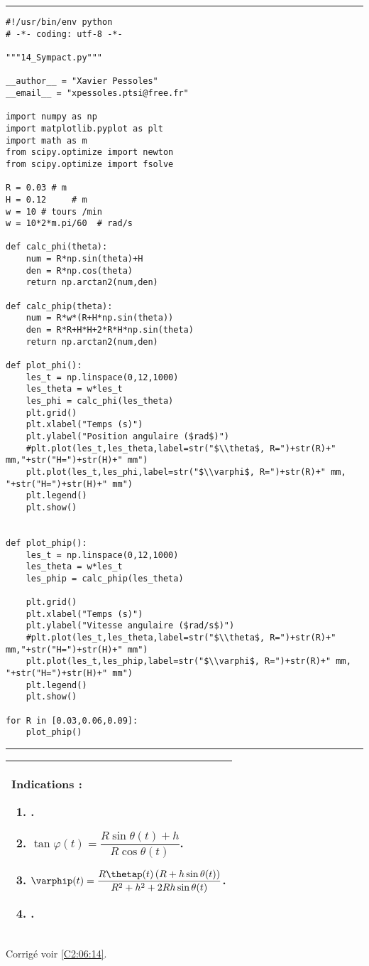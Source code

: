\noindent\hrule
\begin{lstlisting}
#!/usr/bin/env python
# -*- coding: utf-8 -*-

"""14_Sympact.py"""

__author__ = "Xavier Pessoles"
__email__ = "xpessoles.ptsi@free.fr"

import numpy as np
import matplotlib.pyplot as plt
import math as m
from scipy.optimize import newton
from scipy.optimize import fsolve

R = 0.03 # m
H = 0.12     # m
w = 10 # tours /min
w = 10*2*m.pi/60  # rad/s

def calc_phi(theta):
    num = R*np.sin(theta)+H
    den = R*np.cos(theta)
    return np.arctan2(num,den)

def calc_phip(theta):
    num = R*w*(R+H*np.sin(theta))
    den = R*R+H*H+2*R*H*np.sin(theta)
    return np.arctan2(num,den)

def plot_phi():
    les_t = np.linspace(0,12,1000)
    les_theta = w*les_t
    les_phi = calc_phi(les_theta)
    plt.grid()
    plt.xlabel("Temps (s)")
    plt.ylabel("Position angulaire ($rad$)")
    #plt.plot(les_t,les_theta,label=str("$\\theta$, R=")+str(R)+" mm,"+str("H=")+str(H)+" mm")
    plt.plot(les_t,les_phi,label=str("$\\varphi$, R=")+str(R)+" mm, "+str("H=")+str(H)+" mm")
    plt.legend()
    plt.show()


def plot_phip():
    les_t = np.linspace(0,12,1000)
    les_theta = w*les_t
    les_phip = calc_phip(les_theta)
    
    plt.grid()
    plt.xlabel("Temps (s)")
    plt.ylabel("Vitesse angulaire ($rad/s$)")
    #plt.plot(les_t,les_theta,label=str("$\\theta$, R=")+str(R)+" mm,"+str("H=")+str(H)+" mm")
    plt.plot(les_t,les_phip,label=str("$\\varphi$, R=")+str(R)+" mm, "+str("H=")+str(H)+" mm")
    plt.legend()
    plt.show()

for R in [0.03,0.06,0.09]:
    plot_phip()
\end{lstlisting}
\noindent\hrule

\else
\fi


\ifprof
\else
\footnotesize
\ifcolle
\else
\begin{center}
\begin{tabular}{|p{.9\linewidth}|}
\hline
Indications :
\begin{enumerate}
\item .
\item $\tan\varphi(t)=\dfrac{R\sin\theta(t)+h}{R \cos\theta(t)}$.
\item $ \varphip(t) =  \dfrac{R \thetap(t)\left(R+h\sin\theta(t)\right)}{R^2+h^2+2 Rh\sin\theta(t)}$.
\item .
\end{enumerate} \\ \hline
\end{tabular}
\end{center}
\fi
\normalsize
\begin{flushright}
\footnotesize{Corrigé  voir \ref{C2:06:14}.}
\end{flushright}%
\fi